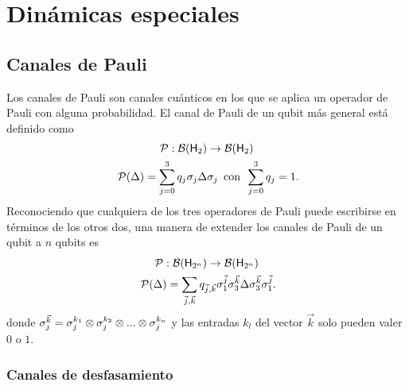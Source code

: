 \section{Dinámicas especiales}

\subsection{Canales de Pauli}

Los canales de Pauli son canales cuánticos en los que se aplica un operador de Pauli con alguna probabilidad. El canal de Pauli de un qubit más general está definido como
\begin{gather}
    \mcP:\mcB(\hilbert_{2}) \rightarrow \mcB(\hilbert_{2})\nonumber\\
    \mcP(\Delta)=\sum_{j=0}^{3}q_{j}\pauli{j}\Delta\pauli{j}\,\text{ con }\, \sum_{j=0}^{3}q_{j}=1\rlap{.}\nonumber
\end{gather}
Reconociendo que cualquiera de los tres operadores de Pauli puede escribirse en términos de los otros dos, una manera de extender los canales de Pauli de un qubit a $n$ qubits es \cite{NPauliOperators}
\begin{gather}\label{eq:PauliChannelN}
    \mcP:\mcB(\hilbert_{2^{n}}) \rightarrow \mcB(\hilbert_{2^{n}})\nonumber\\
    \mcP(\Delta)=\sum_{\vec{j},\vec{k}}q_{\vec{j},\vec{k}}\pauli{1}^{\vec{j}}\pauli{3}^{\vec{k}}\Delta\pauli{3}^{\vec{k}}\pauli{1}^{\vec{j}}\rlap{.}
\end{gather}
donde $\sigma_{j}^{\vec{k}}=\sigma_{j}^{k_{1}}\otimes\sigma_{j}^{k_{2}}\otimes ... \otimes \sigma_{j}^{k_{n}}$ y las entradas $k_{l}$ del vector $\vec{k}$ solo pueden valer $0$ o $1$.

\subsubsection{Canales de desfasamiento}

